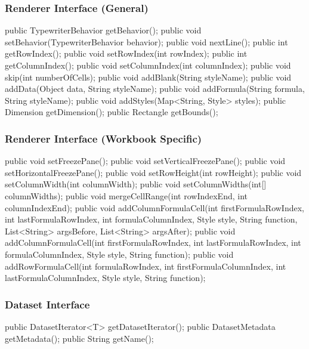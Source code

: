 \documentclass[letterpaper,10pt]{article}
\begin{document}
\subsubsection{Renderer Interface (General)}
\begin{verbatimtab}
 	public TypewriterBehavior getBehavior();
	public void setBehavior(TypewriterBehavior behavior);
	public void nextLine();
	public int getRowIndex();
	public void setRowIndex(int rowIndex);
	public int getColumnIndex();
	public void setColumnIndex(int columnIndex);
	public void skip(int numberOfCells);
	public void addBlank(String styleName);
	public void addData(Object data, String styleName);
	public void addFormula(String formula, String styleName);
	public void addStyles(Map<String, Style> styles);
	public Dimension getDimension();
	public Rectangle getBounds();
\end{verbatimtab}

\subsubsection{Renderer Interface (Workbook Specific)}
\begin{verbatimtab}
	public void setFreezePane();
	public void setVerticalFreezePane();
	public void setHorizontalFreezePane();
	public void setRowHeight(int rowHeight);
	public void setColumnWidth(int columnWidth);
	public void setColumnWidths(int[] columnWidths);
	public void mergeCellRange(int rowIndexEnd, int columnIndexEnd);
	public void addColumnFormulaCell(int firstFormulaRowIndex,
			int lastFormulaRowIndex, int formulaColumnIndex, Style style,
			String function, List<String> argsBefore, List<String> argsAfter);
	public void addColumnFormulaCell(int firstFormulaRowIndex,
			int lastFormulaRowIndex, int formulaColumnIndex, Style style,
			String function);
	public void addRowFormulaCell(int formulaRowIndex,
			int firstFormulaColumnIndex, int lastFormulaColumnIndex,
			Style style, String function);
\end{verbatimtab}

\subsubsection{Dataset Interface}
\begin{verbatimtab}
	public DatasetIterator<T> getDatasetIterator();
	public DatasetMetadata getMetadata();
	public String getName();
\end{verbatimtab}
\end{document}
